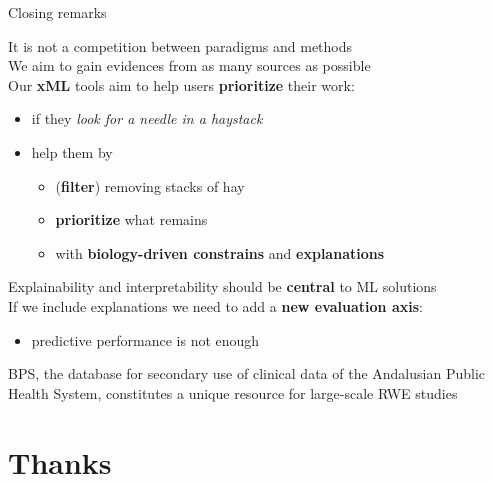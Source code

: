 \documentclass[compress,ignorenonframetext,aspectratio=1610]{beamer}
\begin{document}
\begin{frame}{Closing remarks}
	
	It is not a competition between paradigms and methods \\

	We aim to gain evidences from as many sources as possible \\

	Our \textbf{xML} tools aim to help users \textbf{prioritize} their work:
	\begin{itemize}
		\item if they \textit{look for a needle in a haystack}
		\item help them by
		\begin{itemize}
			\item (\textbf{filter}) removing stacks of hay
			\item \textbf{prioritize} what remains
			\item with \textbf{biology-driven constrains} and \textbf{explanations}
		\end{itemize}
	\end{itemize}

	Explainability and interpretability should be \textbf{central} to ML solutions \\

	If we include explanations we need to add a \textbf{new evaluation axis}:
	\begin{itemize}
		\item predictive performance is not enough
	\end{itemize}

	\begin{block}
	{BPS, the database for secondary use of clinical data of the Andalusian Public Health System, constitutes a unique resource for large-scale RWE studies}
	\end{block}

\end{frame}



\section{Thanks}
\end{document}
